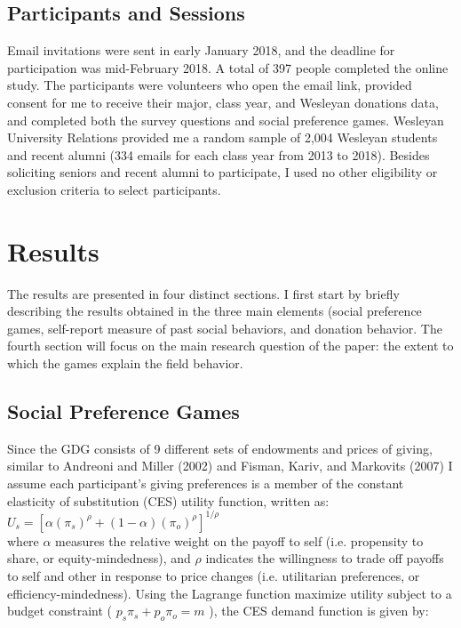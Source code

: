 \documentclass[12pt]{article}
\begin{document}
\subsection{Participants and Sessions}
Email invitations were sent in early January 2018, and the deadline for participation was mid-February 2018. A total of 397 people completed the online study. The participants were volunteers who open the email link, provided consent for me to receive their major, class year, and Wesleyan donations data, and completed both the survey questions and social preference games. Wesleyan University Relations provided me a random sample of 2,004 Wesleyan students and recent alumni (334 emails for each class year from 2013 to 2018). Besides soliciting seniors and recent alumni to participate, I used no other eligibility or exclusion criteria to select participants.


\section{Results}
The results are presented in four distinct sections. I first start by briefly describing the results obtained in the three main elements (social preference games, self-report measure of past social behaviors, and donation behavior. The fourth section will focus on the main research question of the paper: the extent to which the games explain the field behavior.

\subsection{Social Preference Games}
Since the GDG consists of 9 different sets of endowments and prices of giving, similar to Andreoni and Miller (2002) and Fisman, Kariv, and Markovits (2007) I assume each participant's giving preferences is a member of the constant elasticity of substitution (CES) utility function, written as: \\

\(U_{s} = [\alpha(\pi_{s})^{\rho} + (1-\alpha)(\pi_{o})^{\rho}]^{1/\rho} \) \\

\noindent
where \(\alpha\) measures the relative weight on the payoff to self (i.e. propensity to share, or equity-mindedness), and \(\rho\) indicates the willingness to trade off payoffs to self and other in response to price changes (i.e. utilitarian preferences, or efficiency-mindedness). Using the Lagrange function maximize utility subject to a budget constraint ( \(p_{s}\pi_{s} + p_{o}\pi_{o}=m\) ), the CES demand function is given by: \\
 
\end{document}
